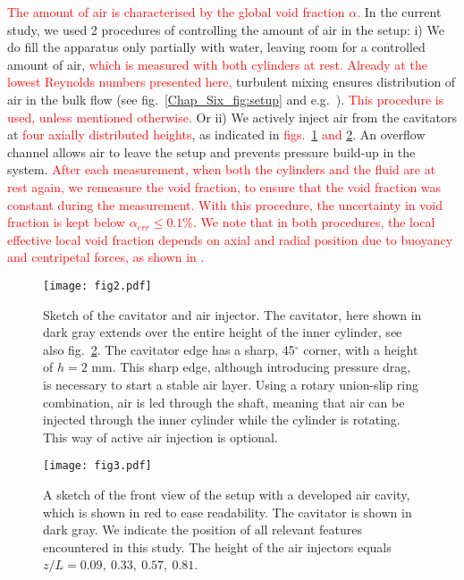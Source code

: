 \documentclass[aps,onecolumn,10pt, floatfix, superscriptaddress,longbibliography, pra]{revtex4-1}
\newcommand{\red}[1]{\textcolor{red}{#1}}
\begin{document}
\red{The amount of air is characterised by the global void fraction $\alpha$.} In the current study, we used 2 procedures of controlling the amount of air in the setup: i) We do fill the apparatus only partially with water, leaving room for a controlled amount of air, \red{which is measured with both cylinders at rest. Already at the lowest Reynolds numbers presented here, }turbulent mixing ensures distribution of air in the bulk flow (see fig.\ \ref{Chap_Six_fig:setup} and e.g.\ \citet{ver16}). \red{This procedure is used, unless mentioned otherwise.} Or ii) We actively inject air from the cavitators at \red{four axially distributed heights}, as indicated in \red{figs.\ \ref{Chap_Six_fig:cav} and \ref{Chap_Six_fig:sketch_cavity}}. An overflow channel allows air to leave the setup and prevents pressure build-up in the system. \red{After each measurement, when both the cylinders and the fluid are at rest again, we remeasure the void fraction, to ensure that the void fraction was constant during the measurement. With this procedure, the uncertainty in void fraction is kept below $\alpha_{err} \leq 0.1\%$. We note that in both procedures, the local effective local void fraction depends on axial and radial position due to buoyancy and centripetal forces, as shown in \citet{gil13}. }
\begin{figure}[htp]
\centering
\texttt{[image: fig2.pdf]}
\caption{Sketch of the cavitator and air injector. The cavitator, here shown in dark gray extends over the entire height of the inner cylinder, see also fig.\ \ref{Chap_Six_fig:sketch_cavity}. The cavitator edge has a sharp, 45$^{\circ}$ corner, with a height of $h =2$  mm. This sharp edge, although introducing pressure drag, is necessary to start a stable air layer. Using a rotary union-slip ring combination, air is led through the shaft, meaning that air can be injected through the inner cylinder while the cylinder is rotating. This way of active air injection is optional.}
\label{Chap_Six_fig:cav}
\end{figure}


\begin{figure}[htp]
\centering
\texttt{[image: fig3.pdf]}
\caption{A sketch of the front view of the setup with a developed air cavity, which is shown in red to ease readability. The cavitator is shown in dark gray. We indicate the position of all relevant features encountered in this study. The height of the air injectors equals $z/L = {0.09,~0.33,~0.57,~0.81}$.}
\label{Chap_Six_fig:sketch_cavity}
\end{figure}
\end{document}
